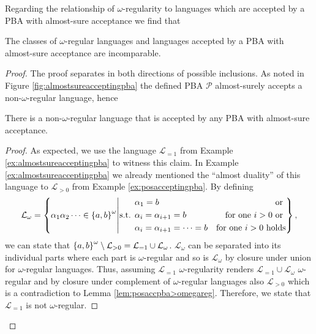 Regarding the relationship of $\omega$-regularity to languages which are 
accepted by a \ac{PBA} with almost-sure acceptance we find that
\begin{theorem}
  \cite[Theorem 4, (b), (c)]{DecProblemsForProbAuto}
  The classes of $\omega$-regular languages and languages accepted by a 
  \ac{PBA} with almost-sure acceptance are incomparable.
  \label{thm:regalmostsureincomparable}
\end{theorem}
\begin{proof}
  The proof separates in both directions of possible inclusions. As noted in
  Figure \ref{fig:almostsureacceptingpba} the defined \ac{PBA} $\mathcal{P}$
  almost-surely accepts a non-$\omega$-regular language, hence
  \begin{lemma}
    There is a non-$\omega$-regular language that is accepted by any \ac{PBA} 
    with almost-sure acceptance.
  \end{lemma}
  \begin{proof}
    As expected, we use the language $\mathcal{L}_{=1}$ from Example 
    \ref{ex:almostsureacceptingpba} to witness this claim. In Example 
    \ref{ex:almostsureacceptingpba} we already mentioned the 
    \enquote{almost duality} of this language to $\mathcal{L}_{>0}$ from 
    Example \ref{ex:posacceptingpba}. By defining
    \begin{equation*}
      \mathcal{L}_{\omega} = \left\{
        \alpha_{1}\alpha_{2}\dots\in\left\{a,b\right\}^{\omega}\middle|
        \text{s.t. }
        \begin{aligned}
          &\alpha_{1} = b&\text{or }\\
          &\alpha_{i} = \alpha_{i+1} = b&\text{for one }i>0\text{ or }\\
          &\alpha_{i} = \alpha_{i+1} = \dots = b&\text{for one }i>0\text{ holds}
        \end{aligned}
      \right\},
    \end{equation*}
    we can state that 
    $\left\{a,b\right\}^{\omega}\setminus\mathcal{L}_{>0} = 
      \mathcal{L}_{=1}\cup\mathcal{L}_{\omega}$.
    $\mathcal{L}_{\omega}$ can be separated into its individual parts where 
    each part is $\omega$-regular and so is $\mathcal{L}_{\omega}$ by closure 
    under union for $\omega$-regular languages. Thus, assuming 
    $\mathcal{L}_{=1}$ $\omega$-regularity renders 
    $\mathcal{L}_{=1}\cup\mathcal{L}_{\omega}$ $\omega$-regular and by closure 
    under complement of $\omega$-regular languages also $\mathcal{L}_{>0}$ 
    which is a contradiction to Lemma \ref{lem:posaccpba>omegareg}. Therefore, 
    we state that $\mathcal{L}_{=1}$ is not $\omega$-regular.
  \end{proof}


\end{proof}
